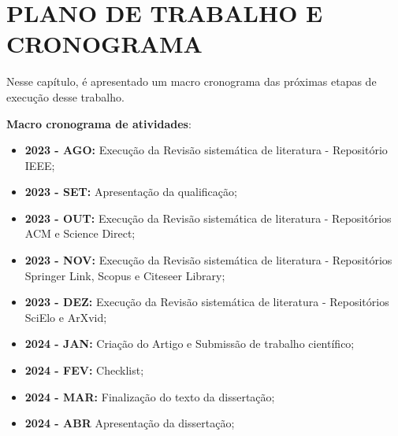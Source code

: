 
\chapter{PLANO DE TRABALHO E CRONOGRAMA}
\label{cap:plano_cronograma}
Nesse capítulo, é apresentado um macro cronograma das próximas etapas de execução desse trabalho.

\textbf{Macro cronograma de atividades}:
\begin{itemize}
    \item \textbf{2023 - AGO:} Execução da Revisão sistemática de literatura - Repositório IEEE;
    \item \textbf{2023 - SET:} Apresentação da qualificação;
    \item \textbf{2023 - OUT:} Execução da Revisão sistemática de literatura - Repositórios ACM e Science Direct;
    \item \textbf{2023 - NOV:} Execução da Revisão sistemática de literatura - Repositórios Springer Link, Scopus e Citeseer Library;
    \item \textbf{2023 - DEZ:} Execução da Revisão sistemática de literatura - Repositórios SciElo e ArXvid;
    \item \textbf{2024 - JAN:} Criação do Artigo e Submissão de trabalho científico;
    \item \textbf{2024 - FEV:} Checklist;
    \item \textbf{2024 - MAR:} Finalização do texto da dissertação;
    \item \textbf{2024 - ABR} Apresentação da dissertação;
\end{itemize}
